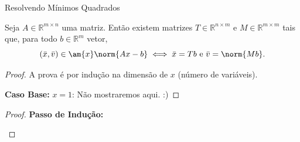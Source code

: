 
\begin{frame}[fragile]{Resolvendo Mínimos Quadrados}
  \begin{theorem}
    Seja $A \in \mathbb{R}^{m \times n}$ uma matriz. Então existem matrizes $T \in \mathbb{R}^{n \times m}$ e $M \in \mathbb{R}^{m \times m}$ tais que, para todo $b \in \mathbb{R}^{m}$ vetor,
    \[
      (\bar{x}, \bar{v})
      \in
      \am{x} \norm{Ax - b}
      \iff
      \bar{x} = T b \text{ e } \bar{v} = \norm{M b}.
    \]
  \end{theorem}
  \pause
  \begin{proof}
    A prova é por indução na dimensão de $x$ (número de variáveis).

    \vspace{0.6cm} \pause

    \textbf{Caso Base:} $x=1$: Não mostraremos aqui. :)
    \renewcommand{\qedsymbol}{}
  \end{proof}
\end{frame}

\begin{frame}
  \begin{proof}
    \textbf{Passo de Indução:}
    \begin{calcproof}[]
    \end{calcproof}
    \renewcommand{\qedsymbol}{}
  \end{proof}
\end{frame}

